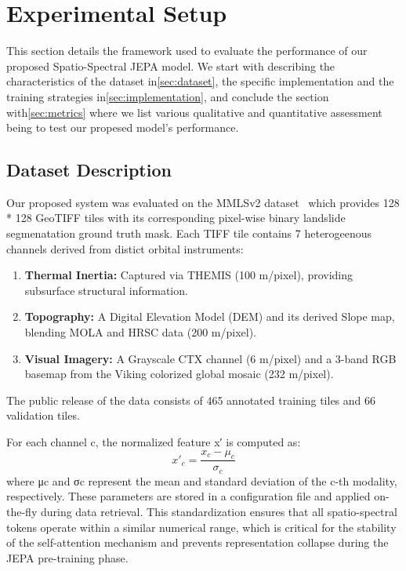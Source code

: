 \section{Experimental Setup}
\label{sec:experiments}

This section details the framework used to evaluate the performance of our proposed Spatio-Spectral JEPA model. We start with describing the characteristics of the dataset in\cref{sec:dataset}, the specific implementation and the training strategies in\cref{sec:implementation}, and conclude the section with\cref{sec:metrics} where we list various qualitative and quantitative assessment being to test our propesed model's performance.

\subsection{Dataset Description}
\label{sec:label}
Our proposed system was evaluated on the MMLSv2 dataset~\cite{mmlsv2_2026} which provides 128 * 128 GeoTIFF tiles with its corresponding pixel-wise binary landslide segmenatation ground truth mask. Each TIFF tile contains 7 heterogeenous channels derived from distict orbital instruments:
\begin{enumerate}
\item \textbf{Thermal Inertia:} Captured via THEMIS (100 m/pixel), providing subsurface structural information.
\item \textbf{Topography:} A Digital Elevation Model (DEM) and its derived Slope map, blending MOLA and HRSC data (200 m/pixel).
\item \textbf{Visual Imagery:} A Grayscale CTX channel (6 m/pixel) and a 3-band RGB basemap from the Viking colorized global mosaic (232 m/pixel).
\end{enumerate}

The public release of the data consists of 465 annotated training tiles and 66 validation tiles. 

For each channel c, the normalized feature x′ is computed as:
\begin{equation}
x'_c = \frac{x_c - \mu_c}{\sigma_c}
\end{equation}
where μc and σc represent the mean and standard deviation of the c-th modality, respectively. These parameters are stored in a configuration file and applied on-the-fly during data retrieval. This standardization ensures that all spatio-spectral tokens operate within a similar numerical range, which is critical for the stability of the self-attention mechanism and prevents representation collapse during the JEPA pre-training phase.


